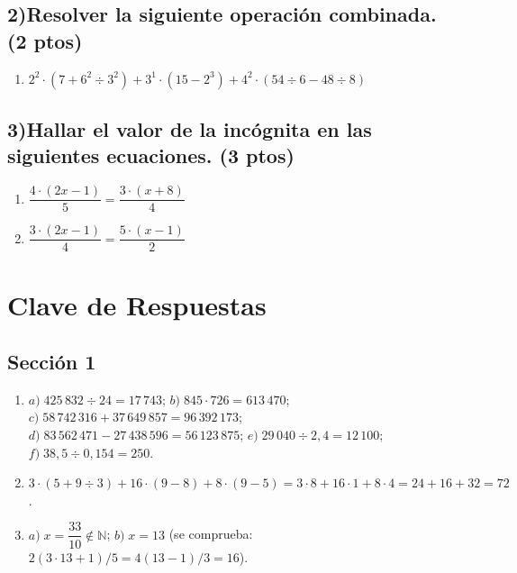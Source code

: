 \documentclass[12pt, letterpaper]{article}
\newcommand{\N}{\mathbb{N}}
\begin{document}
\vspace{6pt}

\subsection*{2)\quad Resolver la siguiente operación combinada. \hfill\normalfont\small (2 ptos)}
\begin{enumerate}[label=\alph*), leftmargin=*]
  \item $2^2 \cdot (7 + 6^2 \div 3^2) + 3^1 \cdot (15 - 2^3) + 4^2 \cdot (54 \div 6 - 48 \div 8)$
\end{enumerate}

\vspace{6pt}

\subsection*{3)\quad Hallar el valor de la incógnita en las siguientes ecuaciones. \hfill\normalfont\small (3 ptos)}
\begin{enumerate}[label=\alph*), leftmargin=*]
  \item $\dfrac{4 \cdot (2x - 1)}{5} = \dfrac{3 \cdot (x + 8)}{4}$
  \item $\dfrac{3 \cdot (2x - 1)}{4} = \dfrac{5 \cdot (x - 1)}{2}$
\end{enumerate}

\ifmwclaves
  \newpage
  \section{Clave de Respuestas}

  \subsection*{Sección 1}
  \begin{enumerate}[leftmargin=*, label=\textbf{\arabic*.}]
    \item
          $a)\; 425\,832 \div 24 = 17\,743$; \quad
          $b)\; 845 \cdot 726 = 613\,470$; \quad
          $c)\; 58\,742\,316 + 37\,649\,857 = 96\,392\,173$; \\
          $d)\; 83\,562\,471 - 27\,438\,596 = 56\,123\,875$; \quad
          $e)\; 29\,040 \div 2{,}4 = 12\,100$; \quad
          $f)\; 38{,}5 \div 0{,}154 = 250$.
    \item $3 \cdot (5 + 9 \div 3) + 16 \cdot (9 - 8) + 8 \cdot (9 - 5) = 3 \cdot 8 + 16 \cdot 1 + 8 \cdot 4 = 24 + 16 + 32 = 72$.
    \item
          $a)\; x = \dfrac{33}{10} \notin \N$; \quad
          $b)\; x = 13$ (se comprueba: $2(3 \cdot 13 + 1)/5 = 4(13 - 1)/3 = 16$).
  \end{enumerate}
\end{document}
